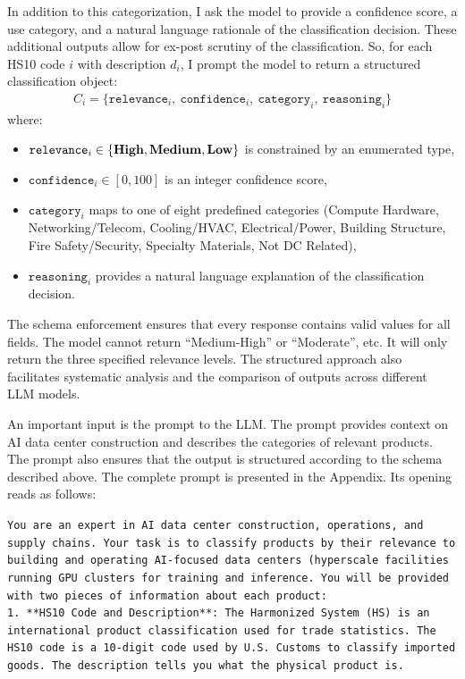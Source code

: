 \documentclass[12pt,pdftex]{article}
\newenvironment{prompt}{\par\medskip\noindent}{\par\medskip}
\begin{document}
\begin{onehalfspacing}
In addition to this categorization, I ask the model to provide a confidence score, a use category, and a natural language rationale of the classification decision. These additional outputs allow for ex-post scrutiny of the classification. So, for each HS10 code $i$ with description $d_i$, I prompt the model to return a structured classification object:
\begin{align*}
    C_i = \{\texttt{relevance}_i, \ \texttt{confidence}_i, \ \texttt{category}_i, \ \texttt{reasoning}_i\}
\end{align*}
\noindent where:
\begin{itemize}
    \item $\texttt{relevance}_i \in \{\text{\textbf{High}}, \text{\textbf{Medium}}, \text{\textbf{Low}}\}$ is constrained by an enumerated type,
    \item $\texttt{confidence}_i \in [0, 100]$ is an integer confidence score,
    \item $\texttt{category}_i$ maps to one of eight predefined categories (Compute Hardware, Networking/Telecom, Cooling/HVAC, Electrical/Power, Building Structure, Fire Safety/Security, Specialty Materials, Not DC Related),
    \item $\texttt{reasoning}_i$ provides a natural language explanation of the classification decision.
\end{itemize}
The schema enforcement ensures that every response contains valid values for all fields. The model cannot return ``Medium-High'' or ``Moderate'', etc. It will only return the three specified relevance levels. The structured approach also facilitates systematic analysis and the comparison of outputs across different LLM models.

An important input is the prompt to the LLM. The prompt provides context on AI data center construction and describes the categories of relevant products. The prompt also ensures that the output is structured according to the schema described above. The complete prompt is presented in the Appendix. Its opening reads as follows:
\begin{prompt}
\texttt{You are an expert in AI data center construction, operations, and supply chains. Your task is to classify products by their relevance to building and operating AI-focused data centers (hyperscale facilities running GPU clusters for training and inference. You will be provided with two pieces of information about each product:}\\

\texttt{1. **HS10 Code and Description**: The Harmonized System (HS) is an international product classification used for trade statistics. The HS10 code is a 10-digit code used by U.S. Customs to classify imported goods. The description tells you what the physical product is.}\\


\end{prompt}
\end{onehalfspacing}
\end{document}
